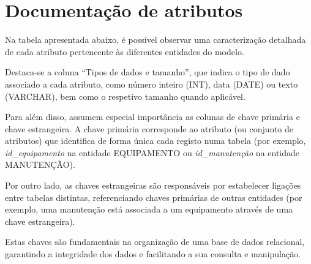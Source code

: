 \chapter{ Documentação de atributos}

Na tabela apresentada abaixo, é possível observar uma caracterização detalhada de cada atributo pertencente às diferentes entidades do modelo.

Destaca-se a coluna “Tipos de dados e tamanho”, que indica o tipo de dado associado a cada atributo, como número inteiro (INT), data (DATE) ou texto (VARCHAR), bem como o respetivo tamanho quando aplicável.

Para além disso, assumem especial importância as colunas de chave primária e chave estrangeira. A chave primária corresponde ao atributo (ou conjunto de atributos) que identifica de forma única cada registo numa tabela (por exemplo, \textit{id\_equipamento} na entidade EQUIPAMENTO ou \textit{id\_manutenção} na entidade MANUTENÇÃO).

Por outro lado, as chaves estrangeiras são responsáveis por estabelecer ligações entre tabelas distintas, referenciando chaves primárias de outras entidades (por exemplo, uma manutenção está associada a um equipamento através de uma chave estrangeira).

Estas chaves são fundamentais na organização de uma base de dados relacional, garantindo a integridade dos dados e facilitando a sua consulta e manipulação.

\renewcommand{\arraystretch}{1.0}

